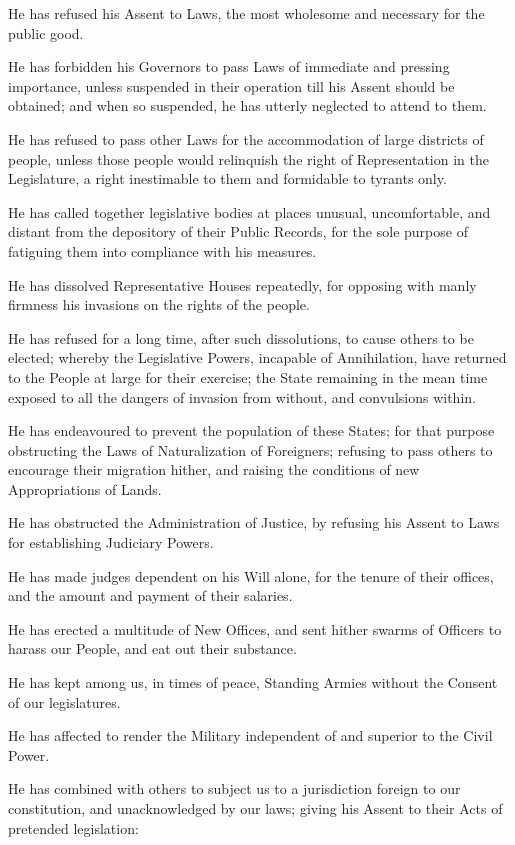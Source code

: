 \documentclass{article}
\begin{document}
He has refused his Assent to Laws, the most wholesome and necessary
for the public good.

He has forbidden his Governors to pass Laws of immediate
and pressing importance, unless suspended in their operation
till his Assent should be obtained; and when so suspended,
he has utterly neglected to attend to them.

He has refused to pass other Laws for the accommodation of
large districts of people, unless those people would relinquish
the right of Representation in the Legislature, a right
inestimable to them and formidable to tyrants only.

He has called together legislative bodies at places unusual,
uncomfortable, and distant from the depository of their
Public Records, for the sole purpose of fatiguing them
into compliance with his measures.

He has dissolved Representative Houses repeatedly, for opposing
with manly firmness his invasions on the rights of the people.

He has refused for a long time, after such dissolutions,
to cause others to be elected; whereby the Legislative Powers,
incapable of Annihilation, have returned to the People at large
for their exercise; the State remaining in the mean time exposed
to all the dangers of invasion from without, and convulsions within.

He has endeavoured to prevent the population of these States;
for that purpose obstructing the Laws of Naturalization of Foreigners;
refusing to pass others to encourage their migration hither,
and raising the conditions of new Appropriations of Lands.

He has obstructed the Administration of Justice, by refusing his Assent
to Laws for establishing Judiciary Powers.

He has made judges dependent on his Will alone, for the tenure
of their offices, and the amount and payment of their salaries.

He has erected a multitude of New Offices, and sent hither swarms of
Officers to harass our People, and eat out their substance.

He has kept among us, in times of peace, Standing Armies
without the Consent of our legislatures.

He has affected to render the Military independent of
and superior to the Civil Power.

He has combined with others to subject us to a jurisdiction
foreign to our constitution, and unacknowledged by our laws;
giving his Assent to their Acts of pretended legislation:
\end{document}
